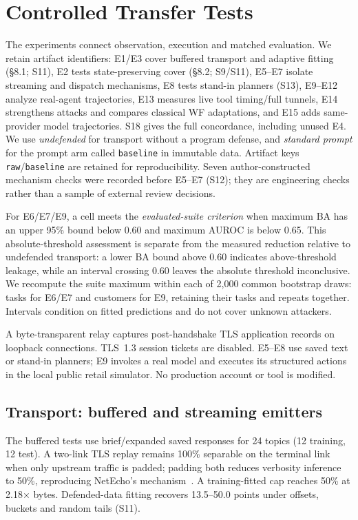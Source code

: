 \section{Controlled Transfer Tests}\label{sec:controlled-placement}\label{sec:tau-cover-bridge}
The experiments connect observation, execution and matched evaluation. We retain artifact identifiers: E1/E3 cover buffered transport and adaptive fitting (\S8.1; S11), E2 tests state-preserving cover (\S8.2; S9/S11), E5--E7 isolate streaming and dispatch mechanisms, E8 tests stand-in planners (S13), E9--E12 analyze real-agent trajectories, E13 measures live tool timing/full tunnels, E14 strengthens attacks and compares classical WF adaptations, and E15 adds same-provider model trajectories. S18 gives the full concordance, including unused E4. We use \emph{undefended} for transport without a program defense, and \emph{standard prompt} for the prompt arm called \texttt{baseline} in immutable data. Artifact keys \texttt{raw}/\texttt{baseline} are retained for reproducibility. Seven author-constructed mechanism checks were recorded before E5--E7 (S12); they are engineering checks rather than a sample of external review decisions.

For E6/E7/E9, a cell meets the \emph{evaluated-suite criterion} when maximum BA has an upper 95\% bound below 0.60 and maximum AUROC is below 0.65. This absolute-threshold assessment is separate from the measured reduction relative to undefended transport: a lower BA bound above 0.60 indicates above-threshold leakage, while an interval crossing 0.60 leaves the absolute threshold inconclusive. We recompute the suite maximum within each of 2,000 common bootstrap draws: tasks for E6/E7 and customers for E9, retaining their tasks and repeats together. Intervals condition on fitted predictions and do not cover unknown attackers.



A byte-transparent relay captures post-handshake TLS application records on loopback connections. TLS~1.3 session tickets are disabled. E5--E8 use saved text or stand-in planners; E9 invokes a real model and executes its structured actions in the local public retail simulator. No production account or tool is modified.

\subsection{Transport: buffered and streaming emitters}
The buffered tests use brief/expanded saved responses for 24 topics (12 training, 12 test). A two-link TLS replay remains 100\% separable on the terminal link when only upstream traffic is padded; padding both reduces verbosity inference to 50\%, reproducing NetEcho's mechanism~\cite{netecho2025}. A training-fitted cap reaches 50\% at 2.18$\times$ bytes. Defended-data fitting recovers 13.5--50.0 points under offsets, buckets and random tails (S11).

